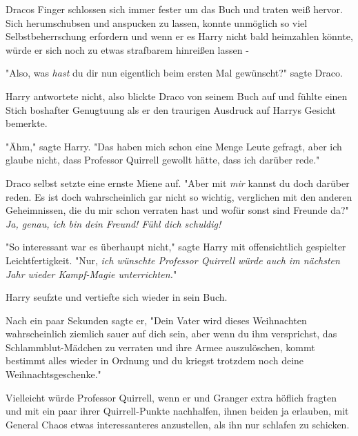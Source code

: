 {Dracos Finger schlossen sich immer fester um das Buch und traten weiß hervor. Sich herumschubsen und anspucken zu lassen, konnte unmöglich so viel Selbstbeherrschung erfordern und wenn er es Harry nicht bald heimzahlen könnte, würde er sich noch zu etwas strafbarem hinreißen lassen -

"Also, was \emph{hast} du dir nun eigentlich beim ersten Mal gewünscht?" sagte Draco.

Harry antwortete nicht, also blickte Draco von seinem Buch auf und fühlte einen Stich boshafter Genugtuung als er den traurigen Ausdruck auf Harrys Gesicht bemerkte.

"Ähm," sagte Harry. "Das haben mich schon eine Menge Leute gefragt, aber ich glaube nicht, dass Professor Quirrell gewollt hätte, dass ich darüber rede."

Draco selbst setzte eine ernste Miene auf. "Aber mit \emph{mir} kannst du doch darüber reden. Es ist doch wahrscheinlich gar nicht so wichtig, verglichen mit den anderen Geheimnissen, die du mir schon verraten hast und wofür sonst sind Freunde da?" \emph{Ja, genau, ich bin dein Freund! Fühl dich schuldig!}

"So interessant war es überhaupt nicht," sagte Harry mit offensichtlich gespielter Leichtfertigkeit. "Nur, \emph{ich wünschte Professor Quirrell würde auch im nächsten Jahr wieder Kampf-Magie unterrichten.}"

Harry seufzte und vertiefte sich wieder in sein Buch.

Nach ein paar Sekunden sagte er, "Dein Vater wird dieses Weihnachten wahrscheinlich ziemlich sauer auf dich sein, aber wenn du ihm versprichst, das Schlammblut-Mädchen zu verraten und ihre Armee auszulöschen, kommt bestimmt alles wieder in Ordnung und du kriegst trotzdem noch deine Weihnachtsgeschenke."

Vielleicht würde Professor Quirrell, wenn er und Granger extra höflich fragten und mit ein paar ihrer Quirrell-Punkte nachhalfen, ihnen beiden ja erlauben, mit General Chaos etwas interessanteres anzustellen, als ihn nur schlafen zu schicken.

}
